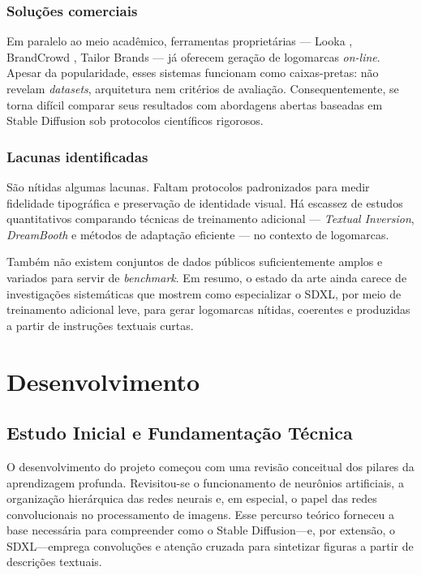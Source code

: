 \documentclass[12pt, %
openright, 
oneside, %
a4paper,    %
brazil]{facom-ufu-abntex2}
\begin{document}
\subsection{Soluções comerciais}

Em paralelo ao meio acadêmico, ferramentas proprietárias — Looka \cite{looka}, BrandCrowd \cite{brandcrowd}, Tailor Brands \cite{tailorbrands} — já oferecem geração de logomarcas \textit{on-line}. Apesar da popularidade, esses sistemas funcionam como caixas-pretas: não revelam \emph{datasets}, arquitetura nem critérios de avaliação. Consequentemente, se torna difícil comparar seus resultados com abordagens abertas baseadas em Stable Diffusion sob protocolos científicos rigorosos.

\subsection{Lacunas identificadas}

São nítidas algumas lacunas. Faltam protocolos padronizados para medir fidelidade tipográfica e preservação de identidade visual. Há escassez de estudos quantitativos comparando técnicas de treinamento adicional — \emph{Textual Inversion}, \emph{DreamBooth} e métodos de adaptação eficiente — no contexto de logomarcas.

Também não existem conjuntos de dados públicos suficientemente amplos e variados para servir de \textit{benchmark}. Em resumo, o estado da arte ainda carece de investigações sistemáticas que mostrem como especializar o SDXL, por meio de treinamento adicional leve, para gerar logomarcas nítidas, coerentes e produzidas a partir de instruções textuais curtas.



\chapter{Desenvolvimento}

\section{Estudo Inicial e Fundamentação Técnica}

O desenvolvimento do projeto começou com uma revisão conceitual dos pilares da aprendizagem profunda. Revisitou-se o funcionamento de neurônios artificiais, a organização hierárquica das redes neurais e, em especial, o papel das redes convolucionais no processamento de imagens. Esse percurso teórico forneceu a base necessária para compreender como o Stable Diffusion—e, por extensão, o SDXL—emprega convoluções e atenção cruzada para sintetizar figuras a partir de descrições textuais.
\end{document}
